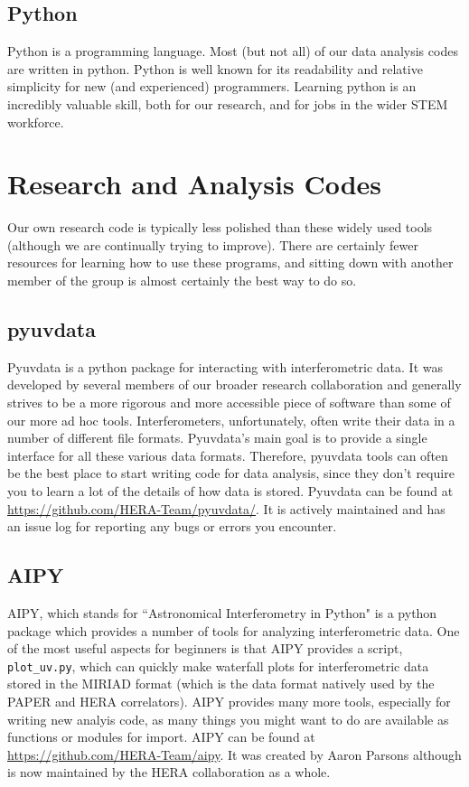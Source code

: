 \subsection{Python}

Python is a programming language.  Most (but not all) of our data analysis codes are written in python.
Python is well known for its readability and relative simplicity for new (and experienced) programmers.
Learning python is an incredibly valuable skill, both for our research, and for jobs in the
wider STEM workforce.

\section{Research and Analysis Codes}

Our own research code is typically less polished than these widely used tools (although we
are continually trying to improve).  There are certainly fewer resources for learning how to use
these programs, and sitting down with another member of the group is almost certainly the best way
to do so.

\subsection{pyuvdata}

Pyuvdata is a python package for interacting with interferometric data.  It was developed by several
members of our broader research collaboration and generally strives to be a more rigorous and
more accessible piece of software than some of our more ad hoc tools.  Interferometers, unfortunately,
often write their data in a number of different file formats.  Pyuvdata's main goal is to provide
a single interface for all these various data formats.  Therefore, pyuvdata tools can 
often be the best place to start writing code for data analysis, since they don't require you to learn
a lot of the details of how data is stored.  Pyuvdata can be found at 
\hyperlink{https://github.com/HERA-Team/pyuvdata/}{https://github.com/HERA-Team/pyuvdata/}.  It is actively maintained and has an issue log
for reporting any bugs or errors you encounter.

\subsection{AIPY}

AIPY, which stands for ``Astronomical Interferometry in Python" is a python package which provides
a number of tools for analyzing interferometric data.  One of the most useful aspects for beginners
is that AIPY provides a script, \texttt{plot\_uv.py}, which can quickly make waterfall plots
for interferometric data stored in the MIRIAD format (which is the data format natively used
by the PAPER and HERA correlators).  AIPY provides many more tools, especially for writing
new analyis code, as many things you might want to do are available as functions or modules for import.
AIPY can be found at \hyperlink{https://github.com/HERA-Team/aipy}{https://github.com/HERA-Team/aipy}.
It was created by Aaron Parsons although is now maintained by the HERA collaboration as a whole.

